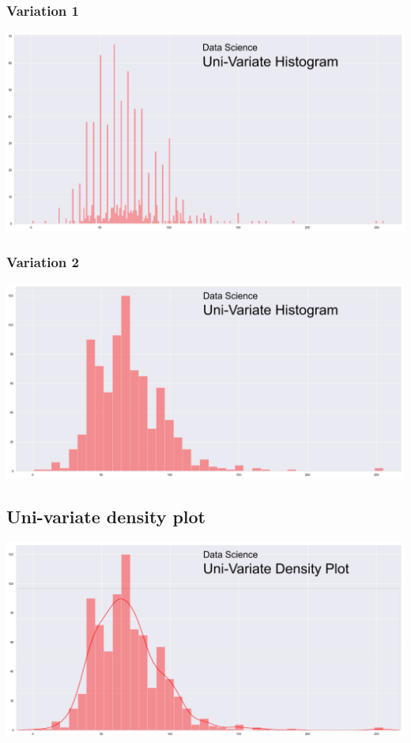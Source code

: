 \documentclass[11pt]{article}
\begin{document}
\subsubsection{Variation 1}
\label{sec:orge9222a0}
\begin{center}
\includegraphics[width=.9\linewidth]{./images/uni-variate-histogram-variation-1.png}
\end{center}
\subsubsection{Variation 2}
\label{sec:org2ec3975}
\begin{center}
\includegraphics[width=.9\linewidth]{./images/uni-variate-histogram-variation-2.png}
\end{center}
\subsection{Uni-variate density plot}
\label{sec:orgce45b1a}
\begin{center}
\includegraphics[width=.9\linewidth]{./images/uni-variate-density-plot.png}
\end{center}
\end{document}
